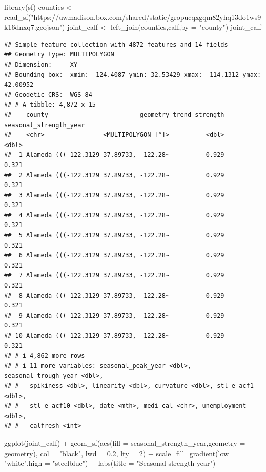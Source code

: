 \documentclass[
]{article}
\newenvironment{Shaded}{\begin{snugshade}}{\end{snugshade}}
\newcommand{\AttributeTok}[1]{\textcolor[rgb]{0.77,0.63,0.00}{#1}}
\newcommand{\DecValTok}[1]{\textcolor[rgb]{0.00,0.00,0.81}{#1}}
\newcommand{\FloatTok}[1]{\textcolor[rgb]{0.00,0.00,0.81}{#1}}
\newcommand{\FunctionTok}[1]{\textcolor[rgb]{0.00,0.00,0.00}{#1}}
\newcommand{\NormalTok}[1]{#1}
\newcommand{\OtherTok}[1]{\textcolor[rgb]{0.56,0.35,0.01}{#1}}
\newcommand{\SpecialCharTok}[1]{\textcolor[rgb]{0.00,0.00,0.00}{#1}}
\newcommand{\StringTok}[1]{\textcolor[rgb]{0.31,0.60,0.02}{#1}}
\begin{document}
\begin{Shaded}
\begin{Highlighting}[]
\FunctionTok{library}\NormalTok{(sf)}
\NormalTok{counties }\OtherTok{\textless{}{-}} \FunctionTok{read\_sf}\NormalTok{(}\StringTok{"https://uwmadison.box.com/shared/static/gropucqxgqm82yhq13do1ws9k16dnxq7.geojson"}\NormalTok{)}
\NormalTok{joint\_calf }\OtherTok{\textless{}{-}} \FunctionTok{left\_join}\NormalTok{(counties,calf,}\AttributeTok{by =} \StringTok{"county"}\NormalTok{)}
\NormalTok{joint\_calf}
\end{Highlighting}
\end{Shaded}

\begin{verbatim}
## Simple feature collection with 4872 features and 14 fields
## Geometry type: MULTIPOLYGON
## Dimension:     XY
## Bounding box:  xmin: -124.4087 ymin: 32.53429 xmax: -114.1312 ymax: 42.00952
## Geodetic CRS:  WGS 84
## # A tibble: 4,872 x 15
##    county                         geometry trend_strength seasonal_strength_year
##    <chr>                <MULTIPOLYGON [°]>          <dbl>                  <dbl>
##  1 Alameda (((-122.3129 37.89733, -122.28~          0.929                  0.321
##  2 Alameda (((-122.3129 37.89733, -122.28~          0.929                  0.321
##  3 Alameda (((-122.3129 37.89733, -122.28~          0.929                  0.321
##  4 Alameda (((-122.3129 37.89733, -122.28~          0.929                  0.321
##  5 Alameda (((-122.3129 37.89733, -122.28~          0.929                  0.321
##  6 Alameda (((-122.3129 37.89733, -122.28~          0.929                  0.321
##  7 Alameda (((-122.3129 37.89733, -122.28~          0.929                  0.321
##  8 Alameda (((-122.3129 37.89733, -122.28~          0.929                  0.321
##  9 Alameda (((-122.3129 37.89733, -122.28~          0.929                  0.321
## 10 Alameda (((-122.3129 37.89733, -122.28~          0.929                  0.321
## # i 4,862 more rows
## # i 11 more variables: seasonal_peak_year <dbl>, seasonal_trough_year <dbl>,
## #   spikiness <dbl>, linearity <dbl>, curvature <dbl>, stl_e_acf1 <dbl>,
## #   stl_e_acf10 <dbl>, date <mth>, medi_cal <chr>, unemployment <dbl>,
## #   calfresh <int>
\end{verbatim}

\begin{Shaded}
\begin{Highlighting}[]
\FunctionTok{ggplot}\NormalTok{(joint\_calf) }\SpecialCharTok{+}
  \FunctionTok{geom\_sf}\NormalTok{(}\FunctionTok{aes}\NormalTok{(}\AttributeTok{fill =}\NormalTok{ seasonal\_strength\_year,}\AttributeTok{geometry =}\NormalTok{ geometry),}
          \AttributeTok{col =} \StringTok{"black"}\NormalTok{, }\AttributeTok{lwd =} \FloatTok{0.2}\NormalTok{, }\AttributeTok{lty =} \DecValTok{2}\NormalTok{) }\SpecialCharTok{+}
  \FunctionTok{scale\_fill\_gradient}\NormalTok{(}\AttributeTok{low =} \StringTok{"white"}\NormalTok{,}\AttributeTok{high =} \StringTok{"steelblue"}\NormalTok{) }\SpecialCharTok{+}
  \FunctionTok{labs}\NormalTok{(}\AttributeTok{title =} \StringTok{"Seasonal strength year"}\NormalTok{)}
\end{Highlighting}
\end{Shaded}
\end{document}
